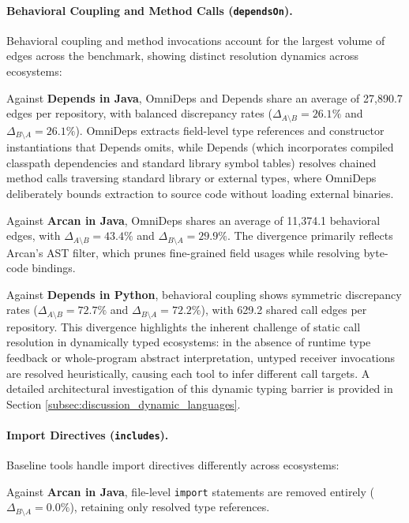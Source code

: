 \paragraph{Behavioral Coupling and Method Calls (\texttt{dependsOn}).}
Behavioral coupling and method invocations account for the largest volume of
edges across the benchmark, showing distinct resolution dynamics
across ecosystems:

Against \textbf{Depends in Java}, OmniDeps and Depends share an
average of 27,890.7 edges per repository, with balanced discrepancy
rates ($\Delta_{A \setminus B} = 26.1\%$ and $\Delta_{B \setminus A}
= 26.1\%$). OmniDeps extracts field-level type references and
constructor instantiations that Depends omits, while Depends (which
  incorporates compiled classpath dependencies and standard library
symbol tables) resolves chained method calls traversing standard
library or external types, where OmniDeps deliberately bounds
extraction to source code without loading external binaries.

Against \textbf{Arcan in Java}, OmniDeps shares an average of
11,374.1 behavioral edges, with $\Delta_{A \setminus B} = 43.4\%$ and
$\Delta_{B \setminus A} = 29.9\%$. The divergence primarily reflects
Arcan's AST filter, which prunes fine-grained field usages while
resolving byte-code bindings.

Against \textbf{Depends in Python}, behavioral coupling shows
symmetric discrepancy rates ($\Delta_{A \setminus B} = 72.7\%$ and
$\Delta_{B \setminus A} = 72.2\%$), with 629.2 shared call edges per
repository. This divergence highlights the inherent challenge of
static call resolution in dynamically typed ecosystems: in the
absence of runtime type feedback or whole-program abstract
interpretation, untyped receiver invocations are resolved
heuristically, causing each tool to infer different call targets. A
detailed architectural investigation of this dynamic typing barrier
is provided in Section \ref{subsec:discussion_dynamic_languages}.

\paragraph{Import Directives (\texttt{includes}).}
Baseline tools handle import directives differently across ecosystems:

Against \textbf{Arcan in Java}, file-level \texttt{import} statements are
removed entirely
($\Delta_{B \setminus A} = 0.0\%$), retaining only resolved type references.

